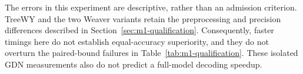 The errors in this experiment are descriptive, rather than an admission criterion. TreeWY and the two Weaver variants retain the preprocessing and precision differences described in Section~\ref{sec:m1-qualification}. Consequently, faster timings here do not establish equal-accuracy superiority, and they do not overturn the paired-bound failures in Table~\ref{tab:m1-qualification}. These isolated GDN measurements also do not predict a full-model decoding speedup.

